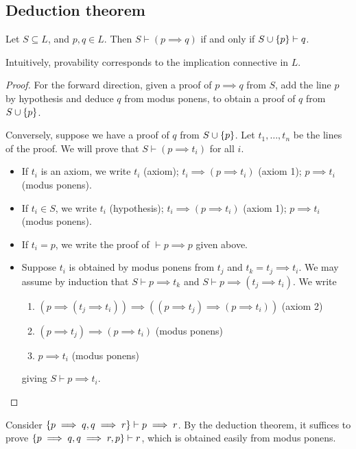 \subsection{Deduction theorem}
\begin{theorem}
    Let \( S \subseteq L \), and \( p, q \in L \).
    Then \( S \vdash (p \implies q) \) if and only if \( S \cup \qty{p} \vdash q \).
\end{theorem}
Intuitively, provability corresponds to the implication connective in \( L \).
\begin{proof}
    For the forward direction, given a proof of \( p \implies q \) from \( S \), add the line \( p \) by hypothesis and deduce \( q \) from modus ponens, to obtain a proof of \( q \) from \( S \cup \qty{p} \).

    Conversely, suppose we have a proof of \( q \) from \( S \cup \qty{p} \).
    Let \( t_1, \dots, t_n \) be the lines of the proof.
    We will prove that \( S \vdash (p \implies t_i) \) for all \( i \).
    \begin{itemize}
        \item If \( t_i \) is an axiom, we write \( t_i \) (axiom); \( t_i \implies (p \implies t_i) \) (axiom 1); \( p \implies t_i \) (modus ponens).
        \item If \( t_i \in S \), we write \( t_i \) (hypothesis); \( t_i \implies (p \implies t_i) \) (axiom 1); \( p \implies t_i \) (modus ponens).
        \item If \( t_i = p \), we write the proof of \( \vdash p \implies p \) given above.
        \item Suppose \( t_i \) is obtained by modus ponens from \( t_j \) and \( t_k = t_j \implies t_i \).
        We may assume by induction that \( S \vdash p \implies t_k \) and \( S \vdash p \implies (t_j \implies t_i) \).
        We write
        \begin{enumerate}[1.]
            \item \( (p \implies (t_j \implies t_i)) \implies ((p \implies t_j) \implies (p \implies t_i)) \) (axiom 2)
            \item \( (p \implies t_j) \implies (p \implies t_i) \) (modus ponens)
            \item \( p \implies t_i \) (modus ponens)
        \end{enumerate}
        giving \( S \vdash p \implies t_i \).
    \end{itemize}
\end{proof}
\begin{example}
    Consider \( \qty{p \implies q, q \implies r} \vdash p \implies r \).
    By the deduction theorem, it suffices to prove \( \qty{p \implies q, q \implies r, p} \vdash r \), which is obtained easily from modus ponens.
\end{example}

